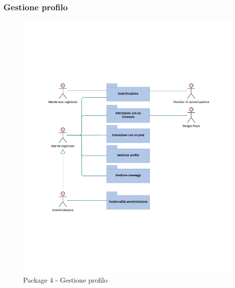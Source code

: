 \documentclass{natourDoc}
\begin{document}
\subsubsection{Gestione profilo}
\begin{figure}[!htbp]
	\centering
	\includegraphics[width=\textwidth, page=5]{./diagrams/useCase.pdf}
	\caption{Package 4 - Gestione profilo}
\end{figure}
\FloatBarrier

\newpage
\end{document}
